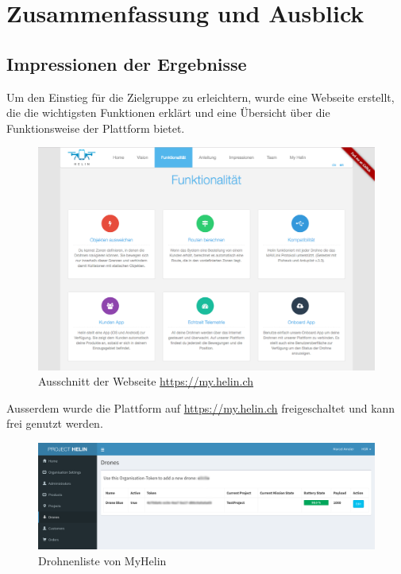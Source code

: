 \chapter{Zusammenfassung und Ausblick}

\section{Impressionen der Ergebnisse}

Um den Einstieg für die Zielgruppe zu erleichtern, wurde eine Webseite erstellt, die die wichtigsten Funktionen erklärt und eine Übersicht über die Funktionsweise der Plattform bietet.

\begin{figure}[H]
	\centering
	\includegraphics[width=1\textwidth] {images/website.png}
	\caption{Ausschnitt der Webseite \url{https://my.helin.ch}}
\end{figure}
\newpage

Ausserdem wurde die Plattform auf \url{https://my.helin.ch} freigeschaltet und kann frei genutzt werden.

\begin{figure}[H]
	\centering
	\includegraphics[width=1.0\textwidth] {images/myhelin.png}
	\caption{Drohnenliste von MyHelin}
\end{figure}

